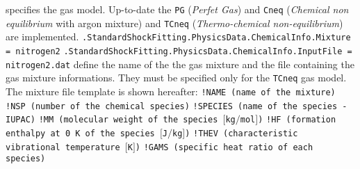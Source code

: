 \documentclass[11pt,a4paper,oneside]{article}
\begin{document}
\newline
\newline
specifies the gas model. Up-to-date the \texttt{PG} (\textit{Perfet Gas}) and \texttt{Cneq} (\textit{Chemical non equilibrium} with argon mixture) and \texttt{TCneq} (\textit{Thermo-chemical non-equilibrium}) are implemented.
\newline
\newline
\hspace*{1cm} \texttt{.StandardShockFitting.PhysicsData.ChemicalInfo.Mixture = nitrogen2}
\newline
\hspace*{1cm} \texttt{.StandardShockFitting.PhysicsData.ChemicalInfo.InputFile = nitrogen2.dat}
\newline
\newline
define the name of the the gas mixture and the file containing the gas mixture informations. They must be specified only for the \texttt{TCneq} gas model.
\newline
The mixture file template is shown hereafter:
\newline
\newline
\hspace*{1.2cm}
\texttt{!NAME \hspace*{2cm} (name of the mixture)}
\newline
\hspace*{1.2cm}
\texttt{!NSP \hspace*{2.2cm} (number of the chemical species)}
\newline
\hspace*{1.2cm}
\texttt{!SPECIES \hspace*{1.4cm} (name of the species - IUPAC)}
\newline
\hspace*{1.2cm}
\texttt{!MM \hspace*{2.4cm} (molecular weight of the species $[$kg$/$mol$]$)}
\newline
\hspace*{1.2cm}
\texttt{!HF \hspace*{2.4cm} (formation enthalpy at 0 K of the species $[$J$/$kg$]$)}
\newline
\hspace*{1.2cm}
\texttt{!THEV \hspace*{2cm} (characteristic vibrational temperature $[$K$]$)}
\newline
\hspace*{1.2cm}
\texttt{!GAMS \hspace*{2cm} (specific heat ratio of each species)}
\end{document}
